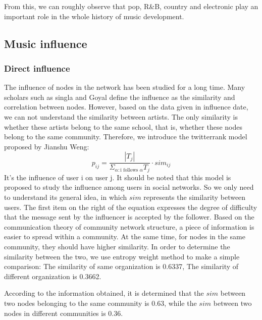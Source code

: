 \documentclass[12pt]{article}  %
\newcommand{\upcite}[1]{\textsuperscript{\textsuperscript{\cite{#1}}}}
\begin{document}
From this, we can roughly observe that pop, R\&B, country and electronic play an important role in the whole history of music development.

\subsection{Music influence}
\subsubsection{Direct influence}

The influence of nodes in the network has been studied for a long time. Many scholars such as singla and Goyal\upcite{1} define the influence as the similarity and correlation between nodes. However, based on the data given in influence date, we can not understand the similarity between artists. The only similarity is whether these artists belong to the same school, that is, whether these nodes belong to the same community. Therefore, we introduce the twitterrank model proposed by Jianshu Weng:
\begin{equation}
p_{ij}=\frac{| T_j|  }{\Sigma_{\alpha : \text{i follows $\alpha$} } T_{j}}\cdot sim_{ij} 
\end{equation}
It's the influence of user i on user j. It should be noted that this model is proposed to study the influence among users in social networks. So we only need to understand its general idea, in which $sim$ represents the similarity between users. The first item on the right of the equation expresses the degree of difficulty that the message sent by the influencer is accepted by the follower.
Based on the communication theory of community network structure, a piece of information is easier to spread within a community. At the same time, for nodes in the same community, they should have higher similarity. In order to determine the similarity between the two, we use entropy weight method to make a simple comparison: The similarity of same organization is 0.6337, The similarity of different organization is 0.3662.

According to the information obtained, it is determined that the $sim$ between two nodes belonging to the same community is 0.63, while the $sim$ between two nodes in different communities is 0.36.
\end{document}
